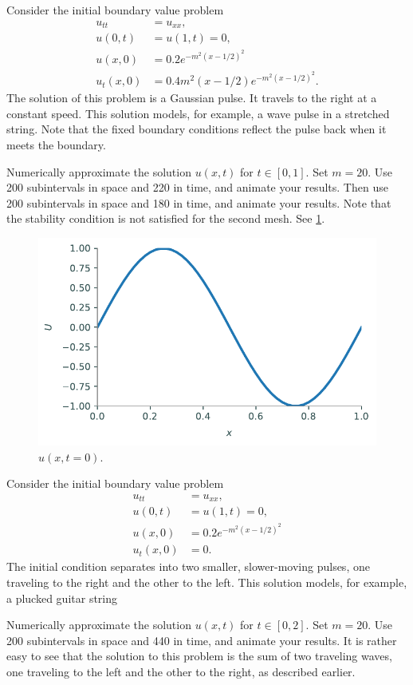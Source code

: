 \begin{problem}
\label{prob:prob2}
Consider the initial boundary value problem
\begin{align*}
	u_{tt} &= u_{xx}, \\
	u(0,t) &= u(1,t) = 0, \\
	u(x,0) &= 0.2e^{-m^2(x-1/2)^2}\\
	u_t(x,0) &= 0.4m^2(x-1/2)e^{-m^2(x-1/2)^2}.
\end{align*}
The solution of this problem is a Gaussian pulse.
It travels to the right at a constant speed.
This solution models, for example, a wave pulse in a stretched string.
Note that the fixed boundary conditions reflect the pulse back when it meets the boundary.

Numerically approximate the solution $u(x,t)$ for $t \in \left[0, 1\right]$.
Set $m=20$.
Use 200 subintervals in space and 220 in time, and animate your results.
Then use 200 subintervals in space and 180 in time, and animate your results.
Note that the stability condition is not satisfied for the second mesh.
See \ref{fig:waveeqn:prob2}.

\begin{figure}[H]
\centering
\includegraphics[width=\textwidth]{figures/prob2.pdf}
\caption{$u(x,t=0)$.}
\label{fig:waveeqn:prob2}
\end{figure}
\end{problem}

\begin{problem}
Consider the initial boundary value problem
\begin{align*}
	u_{tt} &= u_{xx}, \\
	u(0,t) &= u(1,t) = 0, \\
	u(x,0) &= 0.2e^{-m^2(x-1/2)^2}\\
	u_t(x,0) &= 0.
\end{align*}
The initial condition separates into two smaller, slower-moving pulses, one traveling to the right and the other to the left.
This solution models, for example, a plucked guitar string

Numerically approximate the solution $u(x,t)$ for $t \in \left[0,2\right]$.
Set $m=20$.
Use 200 subintervals in space and 440 in time, and animate your results.
It is rather easy to see that the solution to this problem is the sum of two traveling waves, one traveling to the left and the other to the right, as described earlier.
\end{problem}

